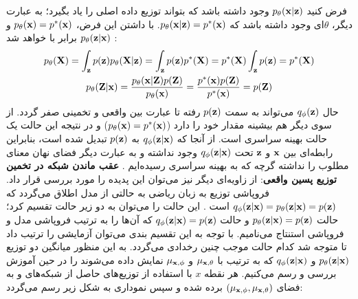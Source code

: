 فرض کنید $p_\theta({\bf x}|{\bf z})$ وجود داشته باشد که بتواند توزیع داده اصلی را یاد بگیرد؛ به عبارت دیگر، $\theta$ای وجود داشته باشد که $p_\theta({\bf x}|{\bf z}) = p^*({\bf x})$. با داشتن این فرض،
$p_\theta({\bf x}) = p^*({\bf x})$
و
$p_\theta({\bf z}|{\bf x})$
برابر با \priordist{} خواهد شد \cite{infovae}:
\begin{gather}
	p_\theta({\bf X}) = \int_{\bf z} p({\bf z}) p_\theta({\bf X}|{\bf z})  = \int_{\bf z} p({\bf z}) p^*({\bf X}) = p^*({\bf X}) \int_{\bf z} p({\bf z}) = p^*({\bf X})
	\\
	p_\theta({\bf Z}|{\bf x}) = \frac{p_\theta({\bf x}|{\bf Z}) p({\bf Z})}{p_\theta({\bf x})} = \frac{p^*({\bf x}) p({\bf Z})}{p^*({\bf x})} = p({\bf Z})
\end{gather}
حال $q_\phi({\bf z})$ می‌تواند به سمت $p({\bf z})$ رفته تا عبارت  بین \posterior{} واقعی و تخمینی صفر گردد. از سوی دیگر هم \likelihood{} بیشینه مقدار خود را دارد ($p_\theta({\bf x}) = p^*({\bf x})$) و در نتیجه این حالت یک حالت بهینه سراسری است. از آنجا که $q_\phi({\bf z}|{\bf x})$ به $p({\bf z})$ تبدیل شده است، بنابراین رابطه‌ای بین ${\bf x}$ و ${\bf z}$ تحت $q_\phi({\bf z}|{\bf x})$ وجود نداشته و به عبارت دیگر فضای نهان معنای مطلوب را نداشته گرچه که به بهینه سراسری رسیده‌ایم \cite{infovae}.
\vspace{.3cm}
\newline
\textbf{عقب ماندن شبکه
	\encoder{}
	در تخمین توزیع پسین واقعی}: 
از زاویه‌ای دیگر نیز می‌توان این پدیده را مورد بررسی قرار داد. فروپاشی توزیع \posterior{} به زبان ریاضی به حالتی از مدل اطلاق می‌گردد که
$q_\phi({\bf z}|{\bf x}) = p_\theta ({\bf z}|{\bf x}) = p({\bf z})$
است \cite{vae_lagging}. این حالت را می‌توان به دو زیر حالت تقسیم کرد؛ حالت $p_\theta({\bf z}|{\bf x}) = p({\bf z})$ و حالت $q_\phi({\bf z}|{\bf x}) = p({\bf z})$ که آن‌ها را به ترتیب فروپاشی مدل و فروپاشی استنتاج می‌نامیم. با توجه به این تقسیم بندی می‌توان آزمایشی را ترتیب داد تا متوجه شد کدام حالت موجب چنین رخدادی می‌گردد. به این منظور میانگین دو توزیع $p_\theta({\bf z}|{\bf x})$ و $q_\phi({\bf z}|{\bf x})$ که به ترتیب با $\mu_{{\bf x},\theta}$ و $\mu_{{\bf x},\phi}$ نمایش داده می‌شوند را در حین آموزش بررسی و رسم می‌کنیم. هر نقطه $x$ با استفاده از توزیع‌های حاصل از شبکه‌های \encoder{} و \decoder{} به فضای
$(\mu_{{\bf x},\phi}, \mu_{{\bf x},\theta})$
برده شده و سپس نموداری به شکل زیر رسم می‌گردد:
